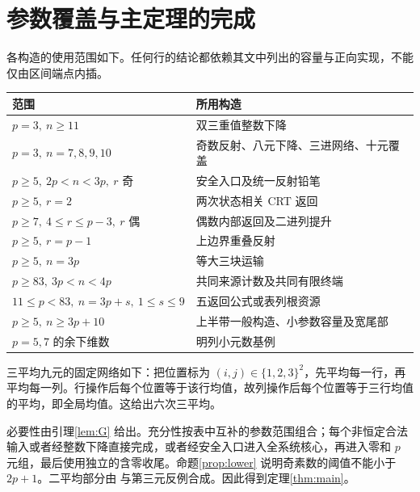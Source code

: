 \documentclass[11pt,a4paper]{article}
\theoremstyle{definition}
\numberwithin{equation}{section}
\begin{document}
\section{参数覆盖与主定理的完成}\label{sec:finish}
各构造的使用范围如下。任何行的结论都依赖其文中列出的容量与正向实现，不能仅由区间端点内插。
\begin{center}
\begin{tabular}{ll}
\toprule
范围 & 所用构造\\\midrule
$p=3,\ n\ge11$ & 双三重值整数下降\\
$p=3,\ n=7,8,9,10$ & 奇数反射、八元下降、三进网络、十元覆盖\\
$p\ge5,\ 2p<n<3p,\ r\text{ 奇}$ & 安全入口及统一反射铅笔\\
$p\ge5,\ r=2$ & 两次状态相关 CRT 返回\\
$p\ge7,\ 4\le r\le p-3,\ r\text{ 偶}$ & 偶数内部返回及二进列提升\\
$p\ge5,\ r=p-1$ & 上边界重叠反射\\
$p\ge5,\ n=3p$ & 等大三块运输\\
$p\ge83,\ 3p<n<4p$ & 共同来源计数及共同有限终端\\
$11\le p<83,\ n=3p+s,\ 1\le s\le9$ & 五返回公式或表列根资源\\
$p\ge5,\ n\ge3p+10$ & 上半带一般构造、小参数容量及宽尾部\\
$p=5,7$ 的余下维数 & 明列小元数基例\\
\bottomrule
\end{tabular}
\end{center}
三平均九元的固定网络如下：把位置标为 $(i,j)\in\{1,2,3\}^2$，先平均每一行，再平均每一列。行操作后每个位置等于该行均值，故列操作后每个位置等于三行均值的平均，即全局均值。这给出六次三平均。

必要性由引理\ref{lem:G} 给出。充分性按表中互补的参数范围组合；每个非恒定合法输入或者经整数下降直接完成，或者经安全入口进入全系统核心，再进入零和 $p$ 元组，最后使用独立的含零收尾。命题\ref{prop:lower} 说明奇素数的阈值不能小于 $2p+1$。二平均部分由\cite{mixing} 与第三元反例合成。因此得到定理\ref{thm:main}。
\end{document}
